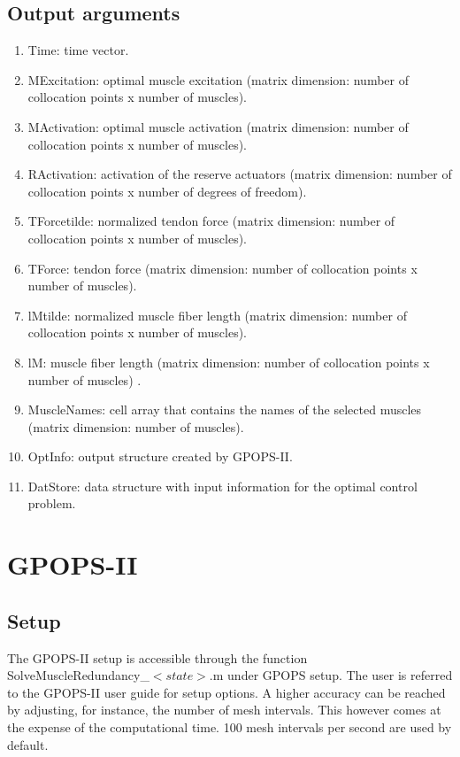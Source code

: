 \documentclass[a4paper,oneside,11pt]{article}
\begin{document}
\subsection{Output arguments}


\begin{enumerate}
	\item Time: time vector.
	\item MExcitation: optimal muscle excitation (matrix dimension: number of collocation points x number of muscles).
	\item MActivation: optimal muscle activation (matrix dimension: number of collocation points x number of muscles).
	\item RActivation: activation of the reserve actuators (matrix dimension: number of collocation points x number of degrees of freedom).
	\item TForcetilde: normalized tendon force (matrix dimension: number of collocation points x number of muscles).
	\item TForce: tendon force (matrix dimension: number of collocation points x number of muscles).
	\item lMtilde: normalized muscle fiber length (matrix dimension: number of collocation points x number of muscles).
	\item lM:  muscle fiber length (matrix dimension: number of collocation points x number of muscles)	.
	\item MuscleNames: cell array that contains the names of the selected muscles (matrix dimension: number of muscles).
	\item OptInfo: output structure created by GPOPS-II.
	\item DatStore: data structure with input information for the optimal control problem.
\end{enumerate}


\section{GPOPS-II}
\subsection{Setup}

The GPOPS-II setup is accessible through the function SolveMuscleRedundancy_$<state>$.m under GPOPS setup. The user is referred to the GPOPS-II user guide for setup options. A higher accuracy can be reached by adjusting, for instance, the number of mesh intervals. This however comes at the expense of the computational time. 100 mesh intervals per second are used by default.
\end{document}
